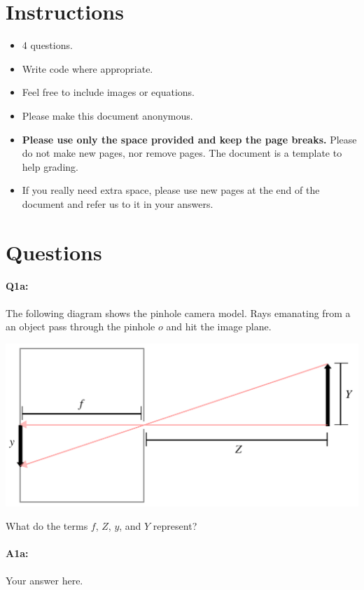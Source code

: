 \section*{Instructions}
\begin{itemize}
  \item 4 questions.
  \item Write code where appropriate.
  \item Feel free to include images or equations.
  \item Please make this document anonymous.
  \item \textbf{Please use only the space provided and keep the page breaks.} Please do not make new pages, nor remove pages. The document is a template to help grading.
  \item If you really need extra space, please use new pages at the end of the document and refer us to it in your answers.
\end{itemize}

\section*{Questions}


\paragraph{Q1a:} 
The following diagram shows the pinhole camera model. Rays emanating
from a an object pass through the pinhole $o$ and hit the image plane.

\includegraphics[width=0.8\linewidth]{pinhole.png}

What do the terms $f$, $Z$, $y$, and $Y$ represent?

\paragraph{A1a:} Your answer here.

